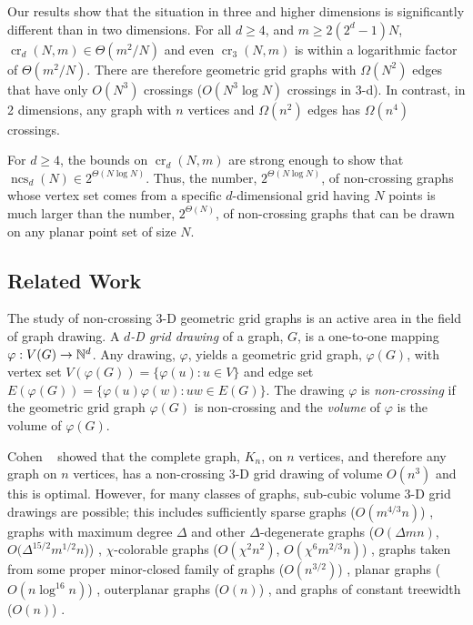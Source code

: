 \documentclass{patmorin}
\newcommand{\n}{N}
\DeclareMathOperator{\crs}{cr}
\DeclareMathOperator{\ncs}{ncs}
\begin{document}
Our results show that the situation in three and higher dimensions
is significantly different than in two dimensions. For all $d \ge
4$, and $m\ge 2(2^d-1)\n$, $\crs_d(\n,m)\in \Theta(m^2/\n)$ and even
$\crs_3(\n,m)$ is within a logarithmic factor of $\Theta(m^2/\n)$.
There are therefore geometric grid graphs with $\Omega(\n^2)$ edges
that have only $O(\n^3)$ crossings ($O(\n^3\log\n)$ crossings in
3-d).  In contrast, in 2 dimensions, any graph with $n$ vertices and
$\Omega(n^2)$ edges has $\Omega(n^4)$ crossings.

For $d\ge 4$, the bounds on $\crs_d(\n,m)$ are strong enough to
show that $\ncs_d(\n)\in 2^{\Theta(\n\log\n)}$.  Thus, the number,
$2^{\Theta(\n\log\n)}$, of non-crossing graphs whose vertex set comes
from a specific $d$-dimensional grid having $\n$ points is much larger
than the number, $2^{\Theta(\n)}$,  of non-crossing graphs that can be
drawn on any planar point set of size $\n$.

\subsection{Related Work}

The study of non-crossing 3-D geometric grid graphs is an
active area in the field of graph drawing.  A \emph{$d$-D
grid drawing} of a graph, $G$, is a
one-to-one mapping $\varphi:V(G)\rightarrow \mathbb{N}^d$.  Any drawing,
$\varphi$, yields a geometric grid graph, $\varphi(G)$, with
vertex set $V(\varphi(G))=\{\varphi(u):u\in V\}$ and edge set
$E(\varphi(G))=\{\varphi(u)\varphi(w):uw\in E(G)\}$.  The drawing
$\varphi$ is \emph{non-crossing} if the geometric grid graph $\varphi(G)$
is non-crossing and the \emph{volume} of $\varphi$ is the volume of
$\varphi(G)$.

Cohen \etal~\cite{cohen.eades.ea:three-dimensional} showed that the
complete graph, $K_n$, on $n$ vertices, and therefore any graph on $n$
vertices, has a non-crossing 3-D grid drawing of volume $O(n^3)$ and this
is optimal.  However, for many classes of graphs, sub-cubic volume 3-D
grid drawings are possible; this includes 
sufficiently sparse graphs ($O(m^{4/3}n)$)
  \cite{dujmovic.wood:three-dimensional}, 
  graphs with maximum degree $\Delta$ and other $\Delta$-degenerate
  graphs 
  ($O(\Delta mn)$, $O(\Delta^{15/2}m^{1/2}n$)) 
  \cite{dujmovic.wood:three-dimensional,dujmovic.wood:upward},
$\chi$-colorable graphs 
  ($O(\chi^2n^2)$, $O(\chi^6m^{2/3}n)$)
  \cite{pach.thiele.ea:three-dimensional,dujmovic.wood:three-dimensional}, 
graphs taken from some proper minor-closed family of graphs 
  ($O(n^{3/2})$)
  \cite{dujmovic.wood:three-dimensional}, 
planar graphs ($O(n\log^{16} n)$)
  \cite{battista.frati.ea:on},
outerplanar graphs ($O(n)$)
  \cite{felsner.liotta.ea:straight-line},
and graphs of constant treewidth ($O(n)$) \cite{dujmovic.morin.ea:layout}.  
\end{document}
